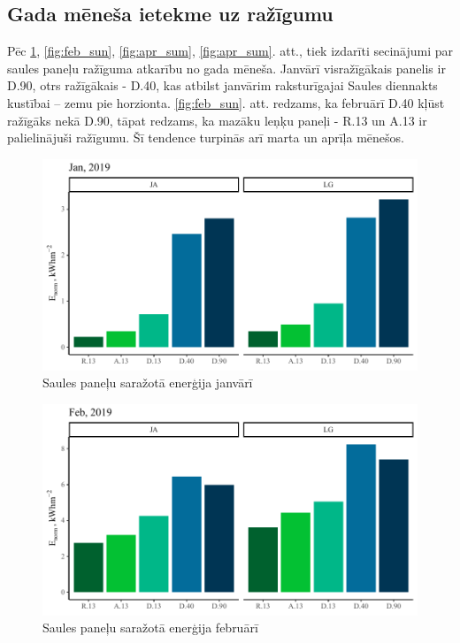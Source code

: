 
\subsection{Gada mēneša ietekme uz ražīgumu} %
Pēc \ref{fig:jan_sum}, \ref{fig:feb_sun}, \ref{fig:apr_sum}, \ref{fig:apr_sum}. att., tiek izdarīti secinājumi par saules paneļu ražīguma atkarību no gada mēneša. Janvārī visražīgākais panelis ir D.90, otrs ražīgākais - D.40, kas atbilst janvārim raksturīgajai Saules diennakts kustībai -- zemu pie horzionta. \ref{fig:feb_sun}. att. redzams, ka februārī D.40 kļūst ražīgāks nekā D.90, tāpat redzams, ka mazāku leņķu paneļi - R.13 un A.13 ir palielinājuši ražīgumu. Šī tendence turpinās arī marta un aprīļa mēnešos.

\begin{figure}[h]
    \centering
    \includegraphics[width=\linewidth]{figures/sol_month/jan_m_m2.pdf}
    \caption{Saules paneļu saražotā enerģija janvārī}
    \label{fig:jan_sum}
\end{figure}

\begin{figure}[h]
    \centering
    \includegraphics[width=\linewidth]{figures/sol_month/feb_m_m2.pdf}
    \caption{Saules paneļu saražotā enerģija februārī}
    \label{fig:feb_sum}
\end{figure}

